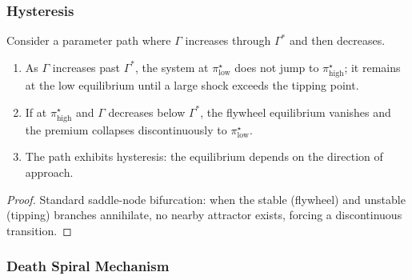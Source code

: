 \subsubsection{Hysteresis}\label{sec:hysteresis}

\begin{proposition}
  \label{prop:hysteresis}
  Consider a parameter path where $\Gamma$ increases through $\Gamma^*$
  and then decreases.
  \begin{enumerate}
    \item As $\Gamma$ increases past $\Gamma^*$, the system at
      $\pi^\star_{\mathrm{low}}$ does not jump to
      $\pi^\star_{\mathrm{high}}$; it remains at the low equilibrium until
      a large shock exceeds the tipping point.
    \item If at $\pi^\star_{\mathrm{high}}$ and $\Gamma$ decreases below
      $\Gamma^*$, the flywheel equilibrium vanishes and the premium
      collapses discontinuously to $\pi^\star_{\mathrm{low}}$.
    \item The path exhibits hysteresis: the equilibrium depends on the
      direction of approach.
  \end{enumerate}
\end{proposition}

\begin{proof}
  Standard saddle-node bifurcation: when the stable (flywheel) and unstable
  (tipping) branches annihilate, no nearby attractor exists, forcing a
  discontinuous transition.
\end{proof}

\subsubsection{Death Spiral Mechanism}\label{sec:death_spiral}

